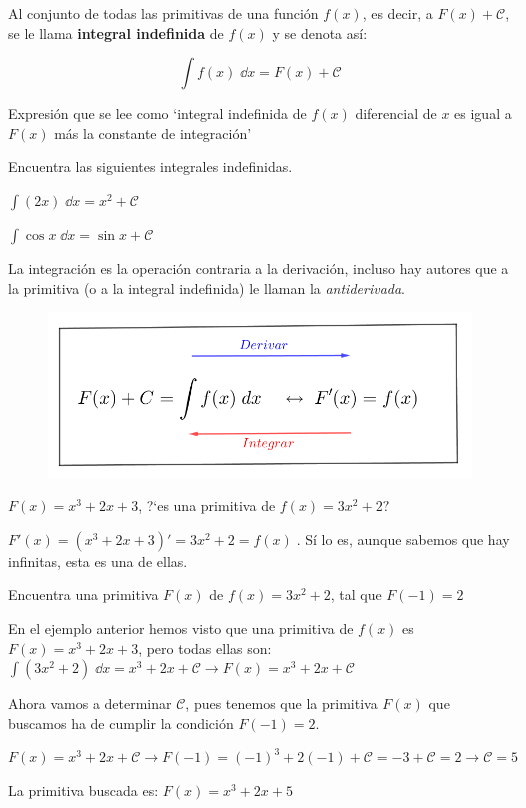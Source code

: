 \begin{defi}
Al conjunto de todas las primitivas de una función $f(x)$, es decir, a $F(x)+\mathcal C	$, se le llama \textbf{integral indefinida} de $f(x)$ y se denota así:

\begin{equation}
 \int f(x)\; \dd x = F(x) + \mathcal C	
\end{equation}

Expresión que se lee como `integral indefinida de $f(x)$ diferencial de $x$ es igual a $F(x)$ más la constante de integración' 

\end{defi}

\begin{ejem}
 Encuentra las siguientes integrales indefinidas.
\begin{multicols}{2}
$\displaystyle \int (2x)\; \dd x = x^2 + \mathcal C$	

$\displaystyle \int \cos x\; \dd x = \sin x + \mathcal C$
\end{multicols}	
\end{ejem}

La integración es la operación contraria a la derivación, incluso hay autores que a la primitiva (o a la integral indefinida) le llaman la \emph{antiderivada}.

	\begin{figure}[H]
			\centering
			\includegraphics[width=0.7
			\textwidth]{imagenes/imagenes07/T07IM01.png}
		\end{figure}

	\begin{ejem}
		$F(x)=x^3+2x+3$, ?`es una primitiva de $f(x)=3x^2+2?$
		
	$F'(x)=(x^3+2x+3)'=	3x^2+2=f(x)\; $. Sí lo es, aunque sabemos que hay infinitas, esta es una de ellas.
	\end{ejem}

	\begin{ejem}
		Encuentra una primitiva $F(x)$ de $f(x)=3x^2+2$, tal que $F(-1)=2$
		
		En el ejemplo anterior hemos visto que una primitiva de $f(x)$ es  $F(x)=x^3+2x+3$, pero todas ellas son: $\displaystyle \int (3x^2+2) \; \dd x =x^3+2x+\mathcal C \to F(x) =x^3+2x+\mathcal C$
		
		Ahora vamos a determinar $\mathcal C$, pues tenemos que la primitiva $F(x)$ que buscamos ha de cumplir la condición $F(-1)=2$.
		
		$F(x)=x^3+2x+\mathcal C \to F(-1)=(-1)^3+2(-1)+\mathcal C= -3 + \mathcal C =2 \to \mathcal C=5  $
		
		La primitiva buscada es: $F(x)=x^3+2x+5$	
	\end{ejem}
	

